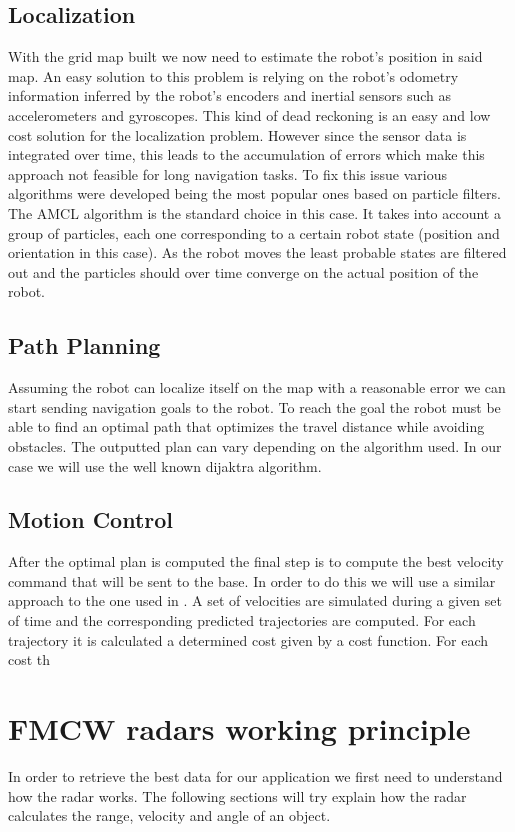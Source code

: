 \subsection{Localization}
With the grid map built we now need to estimate the robot's position in said map. 
An easy solution to this problem is relying on the robot's odometry information inferred by the robot's encoders and inertial sensors such as accelerometers and gyroscopes. This kind of dead reckoning is an easy and low cost solution for the localization problem. However since the sensor data is integrated over time, this leads to the accumulation of errors which make this approach not feasible for long navigation tasks. 
To fix this issue various algorithms were developed being the most popular ones based on particle filters.
The \ac{AMCL} algorithm  is the standard choice in this case. It takes into account a group of particles, each one corresponding to a certain robot state (position and orientation in this case). As the robot moves the least probable states are filtered out and  the particles should over time converge on the actual position of the robot.  
\subsection{Path Planning}
Assuming the robot can localize itself on the map with a reasonable error we can start sending navigation goals to the robot. To reach the goal the robot must be able to find an optimal path that optimizes the travel distance while avoiding obstacles. The outputted plan can vary depending on the algorithm used. In our case we will use the well known dijaktra algorithm.
\subsection{Motion Control}
After the optimal plan is computed the final step is to compute the best velocity command that will be sent to the base.  In order to do this we will use a similar approach to the one used in \cite{gerkey2008planning}. A set of velocities are simulated during a given set of time and the corresponding predicted trajectories are  computed. For each trajectory it is calculated a determined cost given by a cost function. For each cost th
\section {FMCW radars working principle}
In order to retrieve the best data for our application we first need to understand how the radar works. The following sections will try explain how the radar calculates the range, velocity and angle of an object.
